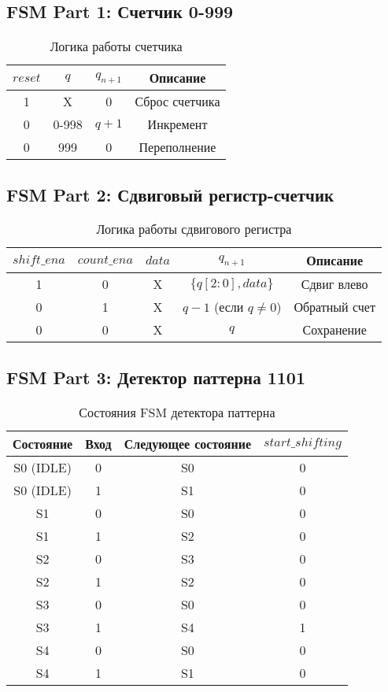 \documentclass[12pt,a4paper]{article}
\begin{document}
\subsection{FSM Part 1: Счетчик 0-999}

\begin{table}[h]
\centering
\caption{Логика работы счетчика}
\begin{tabular}{|c|c|c|c|}
\hline
$reset$ & $q$ & $q_{n+1}$ & Описание \\
\hline
1 & X & 0 & Сброс счетчика \\
0 & 0-998 & $q + 1$ & Инкремент \\
0 & 999 & 0 & Переполнение \\
\hline
\end{tabular}
\end{table}

\subsection{FSM Part 2: Сдвиговый регистр-счетчик}

\begin{table}[h]
\centering
\caption{Логика работы сдвигового регистра}
\begin{tabular}{|c|c|c|c|c|}
\hline
$shift\_ena$ & $count\_ena$ & $data$ & $q_{n+1}$ & Описание \\
\hline
1 & 0 & X & $\{q[2:0], data\}$ & Сдвиг влево \\
0 & 1 & X & $q - 1$ (если $q \neq 0$) & Обратный счет \\
0 & 0 & X & $q$ & Сохранение \\
\hline
\end{tabular}
\end{table}

\subsection{FSM Part 3: Детектор паттерна 1101}

\begin{table}[h]
\centering
\caption{Состояния FSM детектора паттерна}
\begin{tabular}{|c|c|c|c|}
\hline
Состояние & Вход & Следующее состояние & $start\_shifting$ \\
\hline
S0 (IDLE) & 0 & S0 & 0 \\
S0 (IDLE) & 1 & S1 & 0 \\
S1 & 0 & S0 & 0 \\
S1 & 1 & S2 & 0 \\
S2 & 0 & S3 & 0 \\
S2 & 1 & S2 & 0 \\
S3 & 0 & S0 & 0 \\
S3 & 1 & S4 & 1 \\
S4 & 0 & S0 & 0 \\
S4 & 1 & S1 & 0 \\
\hline
\end{tabular}
\end{table}
\end{document}
